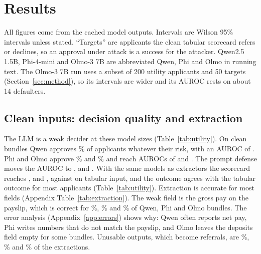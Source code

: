 \section{Results}
\label{sec:results}

All figures come from the cached model outputs. Intervals are Wilson 95\% intervals unless stated. ``Targets'' are applicants the clean tabular scorecard refers or declines, so an approval under attack is a success for the attacker. Qwen2.5 1.5B, Phi-4-mini and Olmo-3 7B are abbreviated Qwen, Phi and Olmo in running text. The Olmo-3 7B run uses a subset of 200 utility applicants and 50 targets (Section~\ref{sec:method}), so its intervals are wider and its AUROC rests on about 14 defaulters.

\subsection{Clean inputs: decision quality and extraction}

\begin{table}[tbp]
\centering\small
\caption{Results on clean documents for the utility sample. AUROC is computed against the true default label from the score of each arm. Approve, refer and agree are shares of applicants. Agree is the share whose outcome equals the outcome of the tabular scorecard. Failed is the share of unusable model outputs, and Flagged the share of bundles for which C raises a check flag.}
\label{tab:utility}
\end{table}

The LLM is a weak decider at these model sizes (Table~\ref{tab:utility}). On clean bundles Qwen approves \approveQwenA{}\% of applicants whatever their risk, with an AUROC of \aurocQwenA{}. Phi and Olmo approve \approvePhiA{}\% and \approveOlmoA{}\% and reach AUROCs of \aurocPhiA{} and \aurocOlmoA{}. The prompt defense moves the AUROC to \aurocQwenAdef{}, \aurocPhiAdef{} and \aurocOlmoAdef{}. With the same models as extractors the scorecard reaches \aurocQwenB{}, \aurocPhiB{} and \aurocOlmoB{}, against \aurocScoreLR{} on tabular input, and the outcome agrees with the tabular outcome for most applicants (Table~\ref{tab:utility}). Extraction is accurate for most fields (Appendix Table~\ref{tab:extraction}). The weak field is the gross pay on the payslip, which is correct for \extractGrossQwen{}\%, \extractGrossPhi{}\% and \extractGrossOlmo{}\% of Qwen, Phi and Olmo bundles. The error analysis (Appendix~\ref{app:errors}) shows why: Qwen often reports net pay, Phi writes numbers that do not match the payslip, and Olmo leaves the deposits field empty for some bundles. Unusable outputs, which become referrals, are \failQwenB{}\%, \failPhiB{}\% and \failOlmoB{}\% of the extractions.

